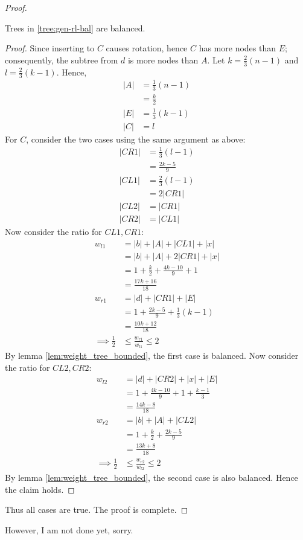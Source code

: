 \documentclass[12pt]{article}
\begin{document}
\begin{proof}
\begin{enumerate}
\begin{description}
\begin{claim}
Trees in \ref{tree:gen-rl-bal} are balanced.
\end{claim}

\begin{proof}
Since inserting to $C$ causes rotation, hence $C$ has more nodes than $E$; consequently, the subtree from $d$ is more nodes than $A$. 
Let $k = \frac{2}{3}(n-1)$ and $l = \frac{2}{3}(k-1)$. Hence,
\begin{align*}
|A| &= \frac{1}{3}(n-1)\\
	&= \frac{k}{2}\\
|E| &= \frac{1}{3}(k-1)\\
|C| &= l
\end{align*}
For $C$, consider the two cases using the same argument as above:
\begin{align*}
|CR1| &= \frac{1}{3}(l-1)\\
	&= \frac{2k-5}{9}\\
|CL1| &= \frac{2}{3}(l-1)\\
	&= 2|CR1|\\
|CL2| &= |CR1|\\
|CR2| &= |CL1|
\end{align*}
Now consider the ratio for $CL1, CR1$:
\begin{align*}
w_{l1} &= |b| + |A| + |CL1| + |x|\\
	&= |b| + |A| + 2|CR1| + |x|\\
	&= 1 + \frac{k}{2} + \frac{4k-10}{9} + 1\\
	&= \frac{17k+16}{18}\\
w_{r1} &= |d| + |CR1| + |E|\\
	&= 1 + \frac{2k-5}{9} + \frac{1}{3}(k-1)\\
	&= \frac{10k+12}{18}\\
\implies \frac{1}{2} &\le \frac{w_{r1}}{w_{l1}} \le 2
\end{align*}
By lemma \ref{lem:weight_tree_bounded}, the first case is balanced. Now consider the ratio for $CL2, CR2$:
\begin{align*}
w_{l2} &= |d| + |CR2| + |x| + |E|\\
	&= 1 + \frac{4k-10}{9} + 1 + \frac{k-1}{3}\\
	&= \frac{14k-8}{18}\\
w_{r2} &= |b| + |A| + |CL2|\\
	&= 1 + \frac{k}{2} + \frac{2k-5}{9}\\
	&= \frac{13k+8}{18}\\
\implies \frac{1}{2} &\le \frac{w_{r2}}{w_{l2}} \le 2
\end{align*}
By lemma \ref{lem:weight_tree_bounded}, the second case is also balanced. Hence the claim holds.
\end{proof}
\end{description}
\end{enumerate}
Thus all cases are true.
The proof is complete.
\end{proof}
However, I am not done yet, sorry.\\
\end{document}
